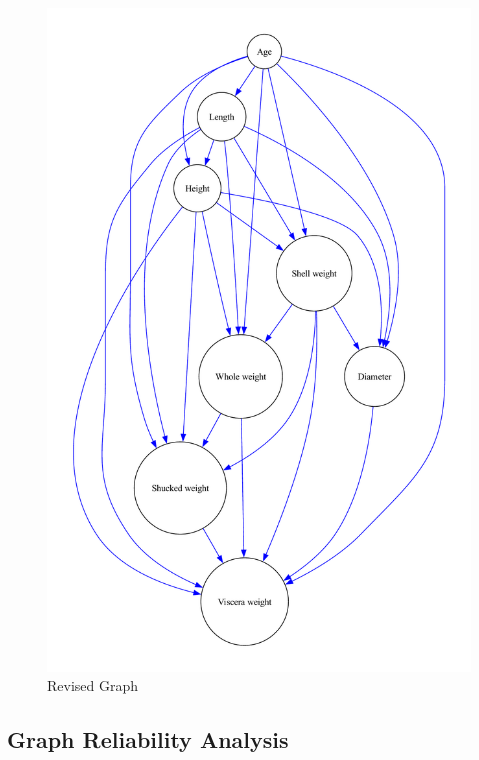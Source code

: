 \documentclass{article}
\begin{document}
\hfill
\begin{minipage}[t]{0.4\linewidth}
    \begin{figure}[H]
        \centering
        \vspace{-0.5cm}
        \includegraphics[width=\linewidth]{./demo_data/20241104_132155/Abalone/output_graph/revised_graph.pdf}
        \caption{\label{fig:corr}Revised Graph}
    \end{figure}
\end{minipage}


\subsection{Graph Reliability Analysis}
\end{document}
